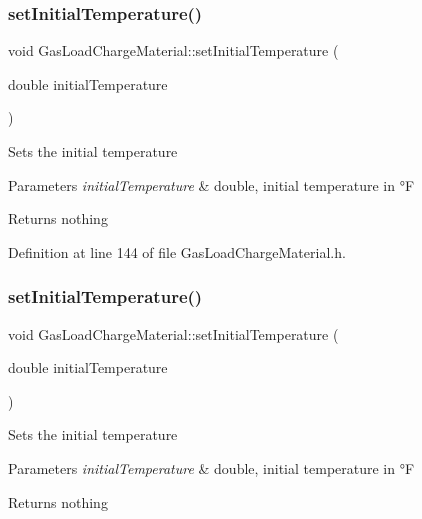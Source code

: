 \subsubsection{\texorpdfstring{set\+Initial\+Temperature()}{setInitialTemperature()}\hspace{0.1cm}{\footnotesize\ttfamily [2/3]}}
{\footnotesize\ttfamily void Gas\+Load\+Charge\+Material\+::set\+Initial\+Temperature (\begin{DoxyParamCaption}\item[{double}]{initial\+Temperature }\end{DoxyParamCaption})\hspace{0.3cm}{\ttfamily [inline]}}

Sets the initial temperature


\begin{DoxyParams}{Parameters}
{\em initial\+Temperature} & double, initial temperature in °F\\
\hline
\end{DoxyParams}
\begin{DoxyReturn}{Returns}
nothing 
\end{DoxyReturn}


Definition at line 144 of file Gas\+Load\+Charge\+Material.\+h.

\mbox{\label{class_gas_load_charge_material_aec9ddfce5e31099b6a047e3d98d80d47}} 
\subsubsection{\texorpdfstring{set\+Initial\+Temperature()}{setInitialTemperature()}\hspace{0.1cm}{\footnotesize\ttfamily [3/3]}}
{\footnotesize\ttfamily void Gas\+Load\+Charge\+Material\+::set\+Initial\+Temperature (\begin{DoxyParamCaption}\item[{double}]{initial\+Temperature }\end{DoxyParamCaption})\hspace{0.3cm}{\ttfamily [inline]}}

Sets the initial temperature


\begin{DoxyParams}{Parameters}
{\em initial\+Temperature} & double, initial temperature in °F\\
\hline
\end{DoxyParams}
\begin{DoxyReturn}{Returns}
nothing 
\end{DoxyReturn}


